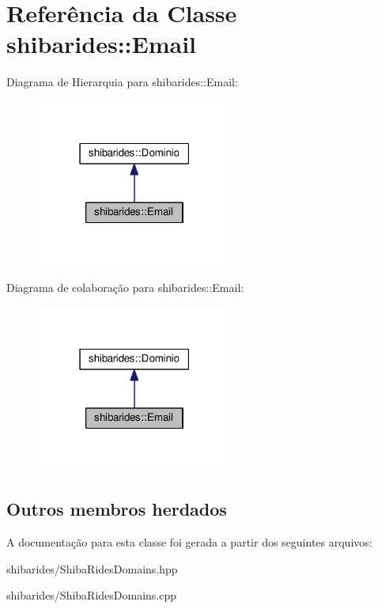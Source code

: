 \hypertarget{classshibarides_1_1Email}{}\section{Referência da Classe shibarides\+:\+:Email}
\label{classshibarides_1_1Email}


Diagrama de Hierarquia para shibarides\+:\+:Email\+:\nopagebreak
\begin{figure}[H]
\begin{center}
\leavevmode
\includegraphics[width=183pt]{classshibarides_1_1Email__inherit__graph}
\end{center}
\end{figure}


Diagrama de colaboração para shibarides\+:\+:Email\+:\nopagebreak
\begin{figure}[H]
\begin{center}
\leavevmode
\includegraphics[width=183pt]{classshibarides_1_1Email__coll__graph}
\end{center}
\end{figure}
\subsection*{Outros membros herdados}


A documentação para esta classe foi gerada a partir dos seguintes arquivos\+:\begin{DoxyCompactItemize}
\item 
shibarides/Shiba\+Rides\+Domains.\+hpp\item 
shibarides/Shiba\+Rides\+Domains.\+cpp\end{DoxyCompactItemize}
